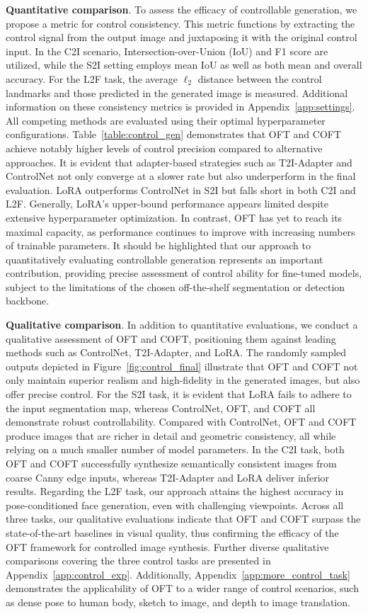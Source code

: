 \textbf{Quantitative comparison}. To assess the efficacy of controllable generation, we propose a metric for control consistency. This metric functions by extracting the control signal from the output image and juxtaposing it with the original control input. In the C2I scenario, Intersection-over-Union (IoU) and F1 score are utilized, while the S2I setting employs mean IoU as well as both mean and overall accuracy. For the L2F task, the average $\ell_2$ distance between the control landmarks and those predicted in the generated image is measured. Additional information on these consistency metrics is provided in Appendix~\ref{app:settings}. All competing methods are evaluated using their optimal hyperparameter configurations. Table~\ref{table:control_gen} demonstrates that OFT and COFT achieve notably higher levels of control precision compared to alternative approaches. It is evident that adapter-based strategies such as T2I-Adapter and ControlNet not only converge at a slower rate but also underperform in the final evaluation. LoRA outperforms ControlNet in S2I but falls short in both C2I and L2F. Generally, LoRA's upper-bound performance appears limited despite extensive hyperparameter optimization. In contrast, OFT has yet to reach its maximal capacity, as performance continues to improve with increasing numbers of trainable parameters. It should be highlighted that our approach to quantitatively evaluating controllable generation represents an important contribution, providing precise assessment of control ability for fine-tuned models, subject to the limitations of the chosen off-the-shelf segmentation or detection backbone.

\textbf{Qualitative comparison}. In addition to quantitative evaluations, we conduct a qualitative assessment of OFT and COFT, positioning them against leading methods such as ControlNet, T2I-Adapter, and LoRA. The randomly sampled outputs depicted in Figure~\ref{fig:control_final} illustrate that OFT and COFT not only maintain superior realism and high-fidelity in the generated images, but also offer precise control. For the S2I task, it is evident that LoRA fails to adhere to the input segmentation map, whereas ControlNet, OFT, and COFT all demonstrate robust controllability. Compared with ControlNet, OFT and COFT produce images that are richer in detail and geometric consistency, all while relying on a much smaller number of model parameters. In the C2I task, both OFT and COFT successfully synthesize semantically consistent images from coarse Canny edge inputs, whereas T2I-Adapter and LoRA deliver inferior results. Regarding the L2F task, our approach attains the highest accuracy in pose-conditioned face generation, even with challenging viewpoints. Across all three tasks, our qualitative evaluations indicate that OFT and COFT surpass the state-of-the-art baselines in visual quality, thus confirming the efficacy of the OFT framework for controlled image synthesis. Further diverse qualitative comparisons covering the three control tasks are presented in Appendix~\ref{app:control_exp}. Additionally, Appendix~\ref{app:more_control_task} demonstrates the applicability of OFT to a wider range of control scenarios, such as dense pose to human body, sketch to image, and depth to image translation.

